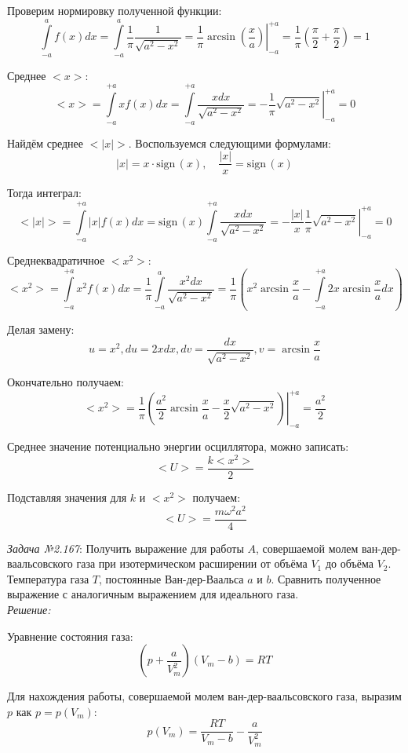 \documentclass[14pt,final,titlepage,pscyr]{hedsemwork}
\newcommand{\sign}{\mathrm{sign\,}}
\begin{document}
Проверим нормировку полученной функции:
\[
	\int\limits_{-a}^{a} f(x)dx = 
		\int\limits_{-a}^{a} \frac{1}{\pi}\frac{1}{\sqrt{a^2-x^2}} = 
		\left. 
			\frac{1}{\pi}\arcsin\left( \frac{x}{a} \right) 
		\right|_{-a}^{+a} = \frac{1}{\pi}
		\left( \frac{\pi}{2} + \frac{\pi}{2} \right) = 1
\]

Среднее \( <x> \):
\[
	<x> = \int\limits_{-a}^{+a} xf(x)dx = 
		\int\limits_{-a}^{+a} \frac{xdx}{\sqrt{a^2-x^2}} = 
		\left. -\frac{1}{\pi}\sqrt{a^2-x^2}\right|_{-a}^{+a} = 0 
\]

Найдём среднее \( <|x|> \). Воспользуемся следующими формулами:
\[
	|x|=x\cdot\sign(x), \quad \frac{|x|}{x} = \sign(x)
\]

Тогда интеграл:
\[
	<|x|> = \int\limits_{-a}^{+a} |x|f(x)dx = 
		\sign(x)\int\limits_{-a}^{+a} \frac{xdx}{\sqrt{a^2-x^2}} = 
		\left. 
			-\frac{|x|}{x}\frac{1}{\pi}\sqrt{a^2-x^2} 
		\right|_{-a}^{+a} = 0 
\]

Среднеквадратичное \( <x^2> \):
\[
	<x^2> = \int\limits_{-a}^{+a} x^2f(x)dx =
		\frac{1}{\pi}\int\limits_{-a}^{a} 
		\frac{x^2dx}{\sqrt{a^2-x^2}} = 
		\frac{1}{\pi}\left( x^2\arcsin\frac{x}{a} - 
		\int\limits_{-a}^{+a} 2x \arcsin\frac{x}{a} dx \right)
\]

Делая замену:
\[
	u = x^2, du = 2xdx, dv = \frac{dx}{\sqrt{a^2-x^2}}, 
	v = \arcsin\frac{x}{a}
\]

Окончательно получаем:
\[
	<x^2> = \left. \frac{1}{\pi} \left( 
		\frac{a^2}{2}\arcsin\frac{x}{a} - 
		\frac{x}{2}\sqrt{a^2-x^2} \right)\right|_{-a}^{+a} = 
		\frac{a^2}{2}
\]

Среднее значение потенциально энергии осциллятора, можно записать:
\[
	<U> = \frac{k<x^2>}{2}
\]

Подставляя значения для \( k \) и \( <x^2> \) получаем:
\[
	<U> = \frac{m\omega^2 a^2}{4}
\]

\newpage
\emph{Задача №2.167}: Получить выражение для работы \( A \), совершаемой 
молем ван-дер-ваальсовского газа при изотермическом расширении от объёма 
\( V_1 \) до объёма \( V_2 \). Температура газа \( T \), постоянные 
Ван-дер-Ваальса \( a \) и \( b \). Сравнить полученное выражение с 
аналогичным выражением для идеального газа. \\

\emph{Решение:}

Уравнение состояния газа:
\[
	\left( p + \frac{a}{V^2_m} \right)\left( V_m - b \right) = RT
\]

Для нахождения работы, совершаемой молем ван-дер-ваальсовского газа, 
выразим \( p \) как \( p = p(V_m) \):
\[
	p(V_m) = \frac{RT}{V_m - b} - \frac{a}{V^2_m}
\]
\end{document}
